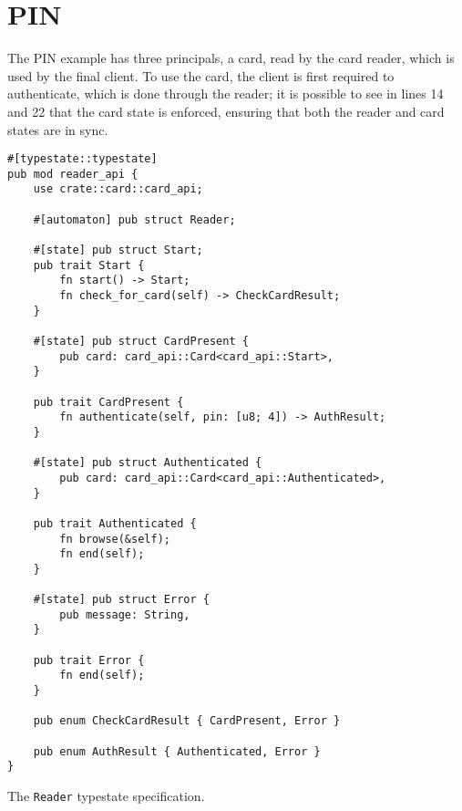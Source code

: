 \section{PIN}

The PIN example has three principals, a card, read by the card reader, which is used by the final client.
To use the card, the client is first required to authenticate, which is done through the reader;
it is possible to see in lines 14 and 22 that the card state is enforced, ensuring that both the reader and card states are in sync.

\begin{listing}
    \begin{verbatim}
#[typestate::typestate]
pub mod reader_api {
    use crate::card::card_api;

    #[automaton] pub struct Reader;

    #[state] pub struct Start;
    pub trait Start {
        fn start() -> Start;
        fn check_for_card(self) -> CheckCardResult;
    }

    #[state] pub struct CardPresent {
        pub card: card_api::Card<card_api::Start>,
    }

    pub trait CardPresent {
        fn authenticate(self, pin: [u8; 4]) -> AuthResult;
    }

    #[state] pub struct Authenticated {
        pub card: card_api::Card<card_api::Authenticated>,
    }

    pub trait Authenticated {
        fn browse(&self);
        fn end(self);
    }

    #[state] pub struct Error {
        pub message: String,
    }

    pub trait Error {
        fn end(self);
    }

    pub enum CheckCardResult { CardPresent, Error }

    pub enum AuthResult { Authenticated, Error }
}
    \end{verbatim}
    \caption{The \texttt{Reader} typestate specification.}
    \label{lst:typestate-reader}
\end{listing}

